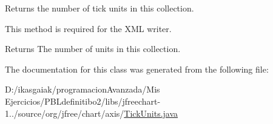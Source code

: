Returns the number of tick units in this collection. 

This method is required for the X\+ML writer.

\begin{DoxyReturn}{Returns}
The number of units in this collection. 
\end{DoxyReturn}


The documentation for this class was generated from the following file\+:\begin{DoxyCompactItemize}
\item 
D\+:/ikasgaiak/programacion\+Avanzada/\+Mis Ejercicios/\+P\+B\+Ldefinitibo2/libs/jfreechart-\/1../source/org/jfree/chart/axis/\mbox{\hyperlink{_tick_units_8java}{Tick\+Units.\+java}}\end{DoxyCompactItemize}

